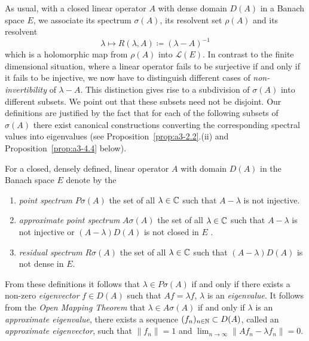 As usual, with a closed linear operator $A$ with dense domain $D(A)$ in a Banach space $E$, we associate its spectrum $\sigma(A)$, its resolvent set $\rho(A)$ and its resolvent
\[
    \lambda \mapsto R(\lambda,A) \coloneqq (\lambda - A)^{-1}
\]
which is a holomorphic map from $\rho(A)$ into $\mathcal{L}(E)$.
In contrast to the finite dimensional situation, where a linear operator fails to be surjective if and only if it fails to be injective, we now have to distinguish different cases of \emph{non-invertibility} of $\lambda - A$.
This distinction gives rise to a subdivision of $\sigma(A)$ into different subsets.
We point out that these subsets need not be disjoint. Our definitions are
justified by the fact that for each of the following subsets of $\sigma(A)$ there exist canonical constructions converting the corresponding spectral values into eigenvalues (see Proposition~\ref{prop:a3-2.2}.(ii) and Proposition~\ref{prop:a3-4.4} below).
\begin{definition}\label{def:a3-2.1}
For a closed, densely defined, linear operator $A$ with domain $D(A)$ in the Banach space $E$ denote by the
\begin{enumerate}[\upshape (i)]
\item 
\emph{point spectrum} $P\sigma(A)$ the set of all $\lambda \in \mathbb{C}$ such that 
$A - \lambda$ is not injective.

\item 
\emph{approximate point spectrum} $A\sigma(A)$ the set of all $\lambda \in \mathbb{C}$ such that $A - \lambda$ is not injective or $(A - \lambda)D(A)$ is not closed in $E$ .

\item 
\emph{residual spectrum} $R\sigma(A)$ the set of all $\lambda \in \mathbb{C}$ such that $(A - \lambda)D(A)$ is not dense in $E$.
\end{enumerate}
\end{definition}
From these definitions it follows that $\lambda \in P\sigma(A)$ if and only if there exists a non-zero \emph{eigenvector} $f \in D(A)$ such that $Af = \lambda f$, \ie $\lambda$ is an \emph{eigenvalue}.
It follows from the \emph{Open Mapping Theorem} that $\lambda \in A\sigma(A)$ if and only if $\lambda$ is an \emph{approximate eigenvalue}, \ie there exists a sequence $(f_{n})_{n \in \mathbb{N}} \subset D(A)$, called an\emph{ approximate eigenvector}, such that $\|f_{n}\| = 1$ and $ \lim_{n \to \infty} \|Af_{n} - \lambda f_{n}\| = 0$.


